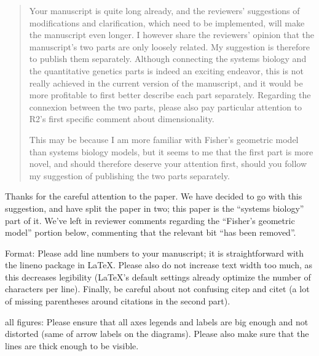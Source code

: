 \begin{quote}
Your manuscript is quite long already, and the reviewers' suggestions of
modifications and clarification, which need to be implemented, will make the
manuscript even longer. I however share the reviewers' opinion that the
manuscript's two parts are only loosely related. My suggestion is therefore to
publish them separately. Although connecting the systems biology and the
quantitative genetics parts is indeed an exciting endeavor, this is not really
achieved in the current version of the manuscript, and it would be more
profitable to first better describe each part separately. Regarding the
connexion between the two parts, please also pay particular attention to R2's
first specific comment about dimensionality.

This may be because I am more familiar with Fisher's geometric model than
systems biology models, but it seems to me that the first part is more novel,
and should therefore deserve your attention first, should you follow my
suggestion of publishing the two parts separately.
\end{quote}

Thanks for the careful attention to the paper.
We have decided to go with this suggestion,
and have split the paper in two;
this paper is the ``systems biology'' part of it.
We've left in reviewer comments regarding the ``Fisher's geometric model'' portion below,
commenting that the relevant bit ``has been removed''.


\begin{point}{Format:}
    Please add line numbers to your manuscript; it is straightforward
with the lineno package in LaTeX.  Please also do not increase text width too
much, as this decreases legibility (LaTeX's default settings already optimize
the number of characters per line).  Finally, be careful about not confusing
citep and citet (a lot of missing parentheses around citations in the second part).
\end{point}


\begin{point}{all figures:}
    Please ensure that all axes legends and labels are big enough
and not distorted (same of arrow labels on the diagrams). Please also make sure
that the lines are thick enough to be visible.
\end{point}



